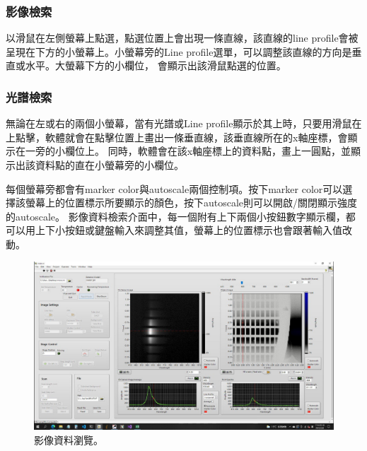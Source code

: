 \documentclass[12pt]{article}
\begin{document}
    \subsubsection{影像檢索}
    以滑鼠在左側螢幕上點選，點選位置上會出現一條直線，該直線的line profile會被呈現在下方的小螢幕上。小螢幕旁的Line profile選單，可以調整該直線的方向是垂直或水平。大螢幕下方的小欄位，
    會顯示出該滑鼠點選的位置。
    \subsubsection{光譜檢索}
    無論在左或右的兩個小螢幕，當有光譜或Line profile顯示於其上時，只要用滑鼠在上點擊，軟體就會在點擊位置上畫出一條垂直線，該垂直線所在的x軸座標，會顯示在一旁的小欄位上。
    同時，軟體會在該x軸座標上的資料點，畫上一圓點，並顯示出該資料點的直在小螢幕旁的小欄位。
    \par \noindent 每個螢幕旁都會有marker color與autoscale兩個控制項。按下marker color可以選擇該螢幕上的位置標示所要顯示的顏色，按下autoscale則可以開啟/關閉顯示強度的autoscale。
    影像資料檢索介面中，每一個附有上下兩個小按鈕數字顯示欄，都可以用上下小按鈕或鍵盤輸入來調整其值，螢幕上的位置標示也會跟著輸入值改動。
    \begin{figure}[h]
        \centering
        \includegraphics[width=\linewidth]{readmode.jpeg}
        \caption{影像資料瀏覽。}
        \label{fig: browsing}
    \end{figure}
\end{document}
